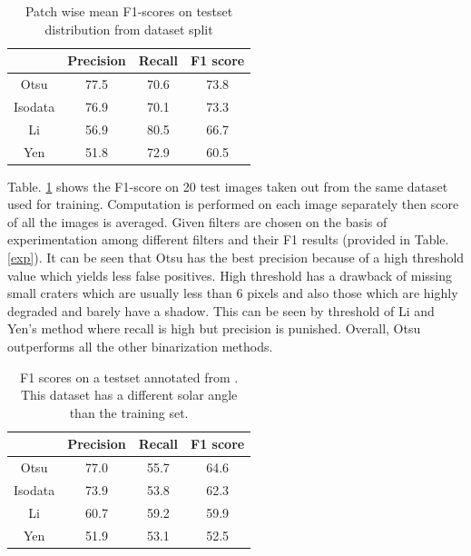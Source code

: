 \documentclass[11pt]{article}
\begin{document}
\begin{table}[H]
	\centering
	\caption{Patch wise mean F1-scores on testset distribution from dataset split}
	\begin{tabular}{c|c|c|c|}
		\cline{2-4}
		\multicolumn{1}{l|}{}         & Precision & Recall & F1 score \\ \hline
		\multicolumn{1}{|c|}{Otsu}    & 77.5      & 70.6   & 73.8     \\ \hline
		\multicolumn{1}{|c|}{Isodata} & 76.9      & 70.1   & 73.3     \\ \hline
		\multicolumn{1}{|c|}{Li}      & 56.9      & 80.5   & 66.7     \\ \hline
		\multicolumn{1}{|c|}{Yen}     & 51.8      & 72.9   & 60.5     \\ \hline
	\end{tabular}
\label{mine}
\end{table}

Table. \ref{mine} shows the F1-score on 20 test images taken out from the same dataset used for training. Computation is performed on each image separately then score of all the images is averaged. Given filters are chosen on the basis of experimentation among different filters and their F1 results (provided in Table. \ref{exp}). It can be seen that Otsu has the best precision because of a high threshold value which yields less false positives. High threshold has a drawback of missing small craters which are usually less than 6 pixels and also those which are highly degraded and barely have a shadow. This can be seen by threshold of Li and Yen's method where recall is high but precision is punished. Overall, Otsu outperforms all the other binarization methods.

\begin{table}[H]
	\centering
	\caption{F1 scores on a testset annotated from \cite{dino2020}. This dataset has a different solar angle than the training set.}
	\begin{tabular}{c|c|c|c|}
		\cline{2-4}
		\multicolumn{1}{l|}{}         & Precision & Recall & F1 score \\ \hline
		\multicolumn{1}{|c|}{Otsu}    & 77.0      & 55.7   & 64.6     \\ \hline
		\multicolumn{1}{|c|}{Isodata} & 73.9      & 53.8   & 62.3     \\ \hline
		\multicolumn{1}{|c|}{Li}      & 60.7      & 59.2   & 59.9     \\ \hline
		\multicolumn{1}{|c|}{Yen}     & 51.9      & 53.1   & 52.5     \\ \hline
	\end{tabular}
\label{dino}
\end{table}
\end{document}
